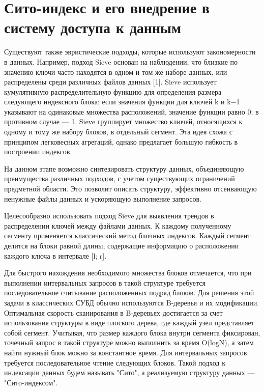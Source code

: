 \section{Сито-индекс и его внедрение в систему доступа к данным}

Существуют также эвристические подходы, которые используют закономерности в данных. Например, подход Sieve основан на наблюдении, что близкие по значению ключи часто находятся в одном и том же наборе данных, или распределены среди различных файлов данных [1]. Sieve использует кумулятивную распределительную функцию для определения размера следующего индексного блока: если значения функции для ключей k и k−1 указывают на одинаковые множества расположений, значение функции равно 0; в противном случае — 1. Sieve группирует множество ключей, относящихся к одному и тому же набору блоков, в отдельный сегмент. Эта идея схожа с принципом легковесных агрегаций, однако предлагает большую гибкость в построении индексов.

На данном этапе возможно синтезировать структуру данных, объединяющую преимущества различных подходов, с учетом существующих ограничений предметной области. Это позволит описать структуру, эффективно отсеивающую ненужные файлы данных и ускоряющую выполнение запросов.

Целесообразно использовать подход Sieve для выявления трендов в распределении ключей между файлами данных. К каждому полученному сегменту применяется классический метод блочных индексов. Каждый сегмент делится на блоки равной длины, содержащие информацию о расположении каждого ключа в интервале [l; r].

Для быстрого нахождения необходимого множества блоков отмечается, что при выполнении интервальных запросов в такой структуре требуется последовательное считывание расположенных подряд блоков. Для решения этой задачи в классических СУБД обычно используются B-деревья и их модификации. Оптимальная скорость сканирования в B-деревьях достигается за счет использования структуры в виде плоского дерева, где каждый узел представляет собой сегмент. Учитывая, что размер каждого блока внутри сегмента фиксирован, точечный запрос в такой структуре можно выполнить за время O(logN), а затем найти нужный блок можно за константное время. Для интервальных запросов требуется последовательное чтение следующих блоков. Такой подход к индексации данных будем называть "Сито", а реализуемую структуру данных — "Сито-индексом".
